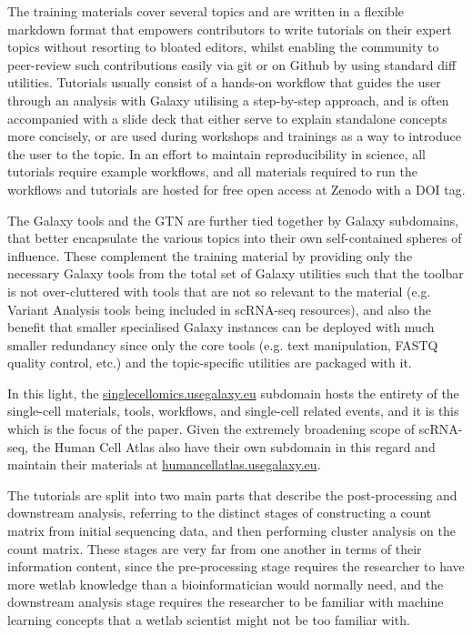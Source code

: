 \documentclass[a4paper,num-refs]{oup-contemporary}
\begin{document}
The training materials cover several topics and are written in a flexible markdown format that empowers contributors to write tutorials on their expert topics without resorting to bloated editors, whilst enabling the community to peer-review such contributions easily via git or on Github by using standard diff utilities. Tutorials usually consist of a hands-on workflow that guides the user through an analysis with Galaxy utilising a step-by-step approach, and is often accompanied with a slide deck that either serve to explain standalone concepts more concisely, or are used during workshops and trainings as a way to introduce the user to the topic. In an effort to maintain reproducibility in science,  all tutorials require example workflows, and all materials required to run the workflows and tutorials are hosted for free open access at Zenodo with a DOI tag.

The Galaxy tools and the GTN are further tied together by Galaxy subdomains, that better encapsulate the various topics into their own self-contained spheres of influence. These complement the training material by providing only the necessary Galaxy tools from the total set of Galaxy utilities such that the toolbar is not over-cluttered with tools that are not so relevant to the material (e.g. Variant Analysis tools being included in scRNA-seq resources), and also the benefit that smaller specialised Galaxy instances can be deployed with much smaller redundancy since only the core tools (e.g. text manipulation, FASTQ quality control, etc.) and the topic-specific utilities are packaged with it.

In this light, the \url{singlecellomics.usegalaxy.eu} subdomain hosts the entirety of the single-cell materials, tools, workflows, and single-cell related events, and it is this which is the focus of the paper. Given the extremely broadening scope of scRNA-seq, the Human Cell Atlas also have their own subdomain in this regard and maintain their materials at \url{humancellatlas.usegalaxy.eu}.

The tutorials are split into two main parts that describe the post-processing and downstream analysis, referring to the distinct stages of constructing a count matrix from initial sequencing data, and then performing cluster analysis on the count matrix. These stages are very far from one another in terms of their information content, since the pre-processing stage requires the researcher to have more wetlab knowledge than a bioinformatician would normally need, and the downstream analysis stage requires the researcher to be familiar with machine learning concepts that a wetlab scientist might not be too familiar with.
\end{document}

